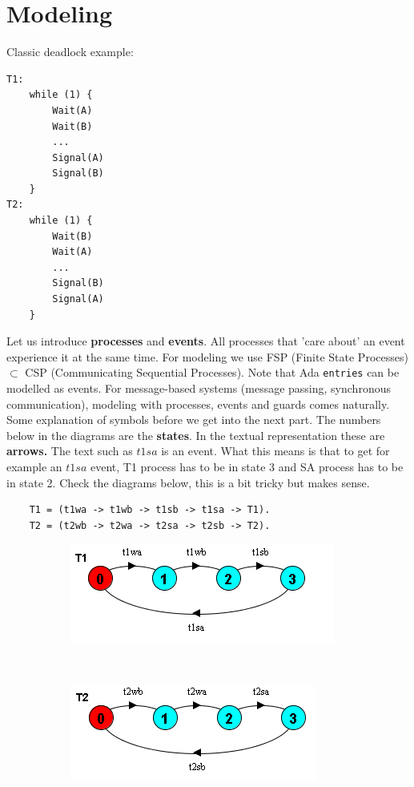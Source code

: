 \section{Modeling}
Classic deadlock example:
\begin{verbatim}
T1:
    while (1) {
        Wait(A)
        Wait(B)
        ...
        Signal(A)
        Signal(B)
    }
T2:
    while (1) {
        Wait(B)
        Wait(A)
        ... 
        Signal(B)
        Signal(A)
    }
\end{verbatim}
Let us introduce \textbf{processes} and \textbf{events}. All processes that 'care about' an event experience it at the same time. For modeling we use FSP (Finite State Processes) $\subset$ CSP (Communicating Sequential Processes). Note that Ada \texttt{entries} can be modelled as events.  For message-based systems (message passing, synchronous communication), modeling with processes, events and guards comes naturally. Some explanation of symbols before we get into the next part. The numbers below in the diagrams are the \textbf{states}. In the textual representation these are \textbf{arrows.} The text such as $t1sa$ is an event. What this means is that to get for example an $t1sa$ event, T1 process has to be in state 3 and SA process has to be in state 2. Check the diagrams below, this is a bit tricky but makes sense.
\begin{verbatim}
    T1 = (t1wa -> t1wb -> t1sb -> t1sa -> T1).
    T2 = (t2wb -> t2wa -> t2sa -> t2sb -> T2).
\end{verbatim}
\begin{figure}[H]
\centering
\begin{subfigure}{.5\textwidth}
\centering
\includegraphics[width=.9\linewidth]{figures/Modeling concurrent programs/Example1/T1.PNG}
\end{subfigure}%
~
\begin{subfigure}{.5\textwidth}
\centering
\includegraphics[width=.9\linewidth]{figures/Modeling concurrent programs/Example1/T2.PNG}
\end{subfigure}
\end{figure}

